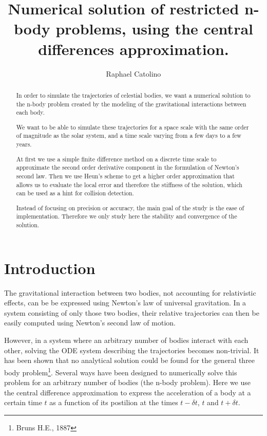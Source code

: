 \documentclass[a4paper,11pt]{article}
\author{Raphael Catolino}
\title{Numerical solution of restricted n-body problems, using
the central differences approximation.}
\begin{document}
\maketitle

\begin{abstract}
  In order to simulate the trajectories of celestial bodies,
  we want a numerical solution to the n-body problem created
  by the modeling of the gravitational interactions between each body.

  We want to be able to simulate these trajectories for a space scale
  with the same order of magnitude as the solar system, and a time scale
  varying from a few days to a few years.

  At first we use a simple finite difference method on a discrete time scale
  to approximate the second order derivative component in the formulation
  of Newton's second law. Then we use Heun's scheme to get a higher order
  approximation that allows us to evaluate the local error and therefore
  the stiffness of the solution, which can be used as a hint for collision
  detection.

  Instead of focusing on precision or accuracy, the main goal of the
  study is the ease of implementation. Therefore we only study here the
  stability and convergence of the solution.
\end{abstract}
\newpage
\tableofcontents
\newpage

\section{Introduction}
The gravitational interaction between two bodies, not accounting for relativistic
effects, can be be expressed using Newton's law of universal gravitation.
In a system consisting of only those two bodies, their relative trajectories
can then be easily computed using Newton's second law of motion.

However, in a system where an arbitrary number of bodies
interact with each other, solving the ODE system describing the
trajectories becomes non-trivial. It has been shown that no analytical solution
could be found for the general three body problem\footnote{Bruns H.E., 1887}.
Several ways have been designed to numerically solve this problem for an
arbitrary number of bodies (the n-body problem). Here we use the central difference
approximation to express the acceleration of a body at a certain time $t$ as a
function of its postilion at the times $t-\delta t$, $t$ and $t+\delta t$.
\end{document}
